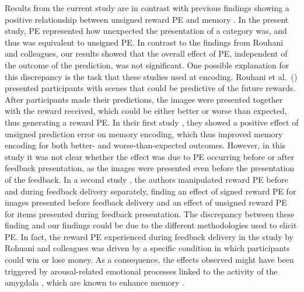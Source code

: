 \documentclass[a4paper,12pt]{article}
\begin{document}
    Results from the current study are in contrast with previous findings showing a positive relationship between unsigned reward PE and memory \citep{Rouhani2018, Rouhani2021}. In the present study, PE represented how unexpected the presentation of a category was, and thus was equivalent to unsigned PE. In contrast to the findings from Rouhani and colleagues, our results showed that the overall effect of PE, independent of the outcome of the prediction, was not significant. One possible explanation for this discrepancy is the task that these studies used at encoding. Rouhani et al.\ (\citeyear{Rouhani2018, Rouhani2021}) presented participants with scenes that could be predictive of the future rewards. After participants made their predictions, the images were presented together with the reward received, which could be either better or worse than expected, thus generating a reward PE. In their first study \citep{Rouhani2018}, they showed a positive effect of unsigned prediction error on memory encoding, which thus improved memory encoding for both better- and worse-than-expected outcomes. However, in this study it was not clear whether the effect was due to PE occurring before or after feedback presentation, as the images were presented even before the presentation of the feedback. In a second study \citep{Rouhani2021}, the authors manipulated reward PE before and during feedback delivery separately, finding an effect of signed reward PE for images presented before feedback delivery and an effect of unsigned reward PE for items presented during feedback presentation. The discrepancy between these finding and our findings could be due to the different methodologies used to elicit PE. In fact, the reward PE experienced during feedback delivery in the study by Rohuani and colleagues \citep{Rouhani2021} was driven by a specific condition in which participants could win or lose money. As a consequence, the effects observed might have been triggered by arousal-related emotional processes linked to the activity of the amygdala \citep{watanabe2019reward}, which are known to enhance memory  \citep{mather2011arousal}. 

\end{document}

